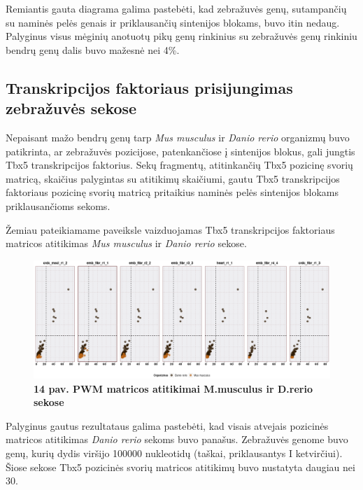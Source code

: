\documentclass[12pt]{article}
\begin{document}
Remiantis gauta diagrama galima pastebėti, kad zebražuvės genų, sutampančių su
naminės pelės genais ir priklausančių sintenijos blokams, buvo itin nedaug.
Palyginus visus mėginių anotuotų pikų genų rinkinius su zebražuvės genų rinkiniu
bendrų genų dalis buvo mažesnė nei 4\%.

\subsection{Transkripcijos faktoriaus prisijungimas zebražuvės sekose}
Nepaisant mažo bendrų genų tarp \emph{Mus musculus} ir \emph{Danio rerio}
organizmų buvo patikrinta, ar zebražuvės pozicijose, patenkančiose į sintenijos
blokus, gali jungtis Tbx5 transkripcijos faktorius. Sekų fragmentų,
atitinkančių Tbx5 pozicinę svorių matricą, skaičius palygintas su atitikimų
skaičiumi, gautu Tbx5 transkripcijos faktoriaus pozicinę svorių matricą
pritaikius naminės pelės sintenijos blokams priklausančioms sekoms.

Žemiau pateikiamame paveiksle vaizduojamas Tbx5 transkripcijos faktoriaus
matricos atitikimas \emph{Mus musculus} ir \emph{Danio rerio} sekose.

\begin{figure}[htb]
    \begin{center}
        \includegraphics[width=1\linewidth]{../Figures/PWM_matches_all.png}
        \vspace{-2\baselineskip}
        \caption*{\small\textbf{14 pav. PWM matricos atitikimai M.musculus ir
        D.rerio sekose}}
        \label{fig:birds}
    \end{center}
\end{figure}

Palyginus gautus rezultataus galima pastebėti, kad visais atvejais pozicinės
matricos atitikimas \emph{Danio rerio} sekoms buvo panašus. Zebražuvės genome
buvo genų, kurių dydis viršijo 100000 nukleotidų (taškai, priklausantys I
ketvirčiui). Šiose sekose Tbx5 pozicinės svorių matricos atitikimų buvo
nustatyta daugiau nei 30.
\end{document}
